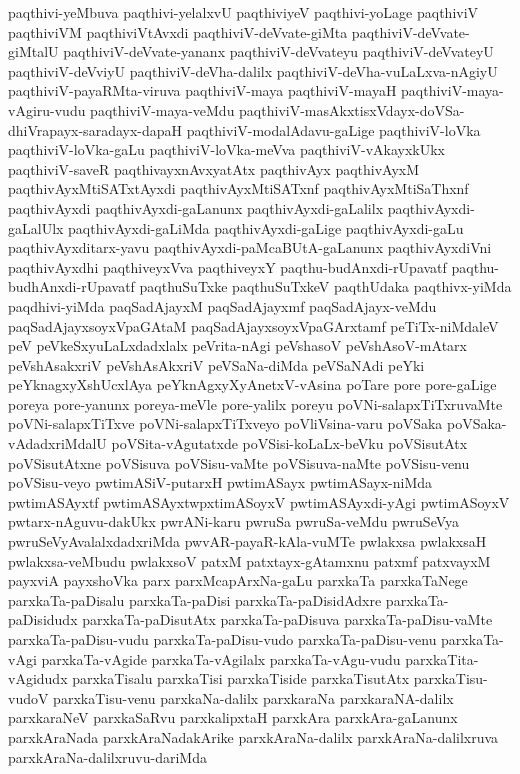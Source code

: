 {paqthivi-yeMbuva
paqthivi-yelalxvU
paqthiviyeV
paqthivi-yoLage
paqthiviV
paqthiviVM
paqthiviVtAvxdi
paqthiviV-deVvate-giMta
paqthiviV-deVvate-giMtalU
paqthiviV-deVvate-yananx
paqthiviV-deVvateyu
paqthiviV-deVvateyU
paqthiviV-deVviyU
paqthiviV-deVha-dalilx
paqthiviV-deVha-vuLaLxva-nAgiyU
paqthiviV-payaRMta-viruva
paqthiviV-maya
paqthiviV-mayaH
paqthiviV-maya-vAgiru-vudu
paqthiviV-maya-veMdu
paqthiviV-masAkxtisxVdayx-doVSa-dhiVrapayx-saradayx-dapaH
paqthiviV-modalAdavu-gaLige
paqthiviV-loVka
paqthiviV-loVka-gaLu
paqthiviV-loVka-meVva
paqthiviV-vAkayxkUkx
paqthiviV-saveR
paqthivayxnAvxyatAtx
paqthivAyx
paqthivAyxM
paqthivAyxMtiSATxtAyxdi
paqthivAyxMtiSATxnf
paqthivAyxMtiSaThxnf
paqthivAyxdi
paqthivAyxdi-gaLanunx
paqthivAyxdi-gaLalilx
paqthivAyxdi-gaLalUlx
paqthivAyxdi-gaLiMda
paqthivAyxdi-gaLige
paqthivAyxdi-gaLu
paqthivAyxditarx-yavu
paqthivAyxdi-paMcaBUtA-gaLanunx
paqthivAyxdiVni
paqthivAyxdhi
paqthiveyxVva
paqthiveyxY
paqthu-budAnxdi-rUpavatf
paqthu-budhAnxdi-rUpavatf
paqthuSuTxke
paqthuSuTxkeV
paqthUdaka
paqthivx-yiMda
paqdhivi-yiMda
paqSadAjayxM
paqSadAjayxmf
paqSadAjayx-veMdu
paqSadAjayxsoyxVpaGAtaM
paqSadAjayxsoyxVpaGArxtamf
peTiTx-niMdaleV
peV
peVkeSxyuLaLxdadxlalx
peVrita-nAgi
peVshasoV
peVshAsoV-mAtarx
peVshAsakxriV
peVshAsAkxriV
peVSaNa-diMda
peVSaNAdi
peYki
peYknagxyXshUcxlAya
peYknAgxyXyAnetxV-vAsina
poTare
pore
pore-gaLige
poreya
pore-yanunx
poreya-meVle
pore-yalilx
poreyu
poVNi-salapxTiTxruvaMte
poVNi-salapxTiTxve
poVNi-salapxTiTxveyo
poVliVsina-varu
poVSaka
poVSaka-vAdadxriMdalU
poVSita-vAgutatxde
poVSisi-koLaLx-beVku
poVSisutAtx
poVSisutAtxne
poVSisuva
poVSisu-vaMte
poVSisuva-naMte
poVSisu-venu
poVSisu-veyo
pwtimASiV-putarxH
pwtimASayx
pwtimASayx-niMda
pwtimASAyxtf
pwtimASAyxtwpxtimASoyxV
pwtimASAyxdi-yAgi
pwtimASoyxV
pwtarx-nAguvu-dakUkx
pwrANi-karu
pwruSa
pwruSa-veMdu
pwruSeVya
pwruSeVyAvalalxdadxriMda
pwvAR-payaR-kAla-vuMTe
pwlakxsa
pwlakxsaH
pwlakxsa-veMbudu
pwlakxsoV
patxM
patxtayx-gAtamxnu
patxmf
patxvayxM
payxviA
payxshoVka
parx
parxMcapArxNa-gaLu
parxkaTa
parxkaTaNege
parxkaTa-paDisalu
parxkaTa-paDisi
parxkaTa-paDisidAdxre
parxkaTa-paDisidudx
parxkaTa-paDisutAtx
parxkaTa-paDisuva
parxkaTa-paDisu-vaMte
parxkaTa-paDisu-vudu
parxkaTa-paDisu-vudo
parxkaTa-paDisu-venu
parxkaTa-vAgi
parxkaTa-vAgide
parxkaTa-vAgilalx
parxkaTa-vAgu-vudu
parxkaTita-vAgidudx
parxkaTisalu
parxkaTisi
parxkaTiside
parxkaTisutAtx
parxkaTisu-vudoV
parxkaTisu-venu
parxkaNa-dalilx
parxkaraNa
parxkaraNA-dalilx
parxkaraNeV
parxkaSaRvu
parxkalipxtaH
parxkAra
parxkAra-gaLanunx
parxkAraNada
parxkAraNadakArike
parxkAraNa-dalilx
parxkAraNa-dalilxruva
parxkAraNa-dalilxruvu-dariMda
}
